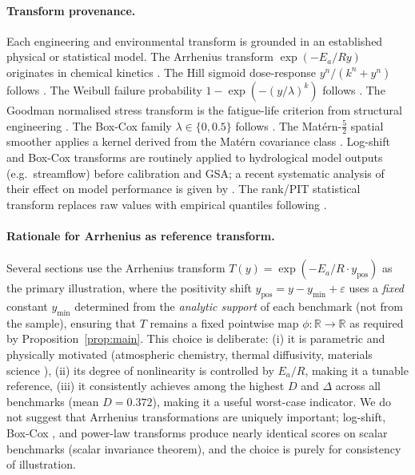 \documentclass[11pt,onecolumn]{article}
\begin{document}
\paragraph{Transform provenance.}
Each engineering and environmental transform is grounded in an established
physical or statistical model.
The Arrhenius transform $\exp(-E_a/Ry)$ originates in chemical kinetics
\citep{Arrhenius1889}.
The Hill sigmoid dose-response $y^n/(k^n + y^n)$ follows \citet{Hill1910}.
The Weibull failure probability $1 - \exp(-(y/\lambda)^k)$ follows
\citet{Weibull1951}.
The Goodman normalised stress transform is the fatigue-life criterion from
structural engineering \citep{SocieMarquis2000}.
The Box-Cox family $\lambda \in \{0, 0.5\}$ follows \citet{BoxCox1964}.
The Matérn-$\tfrac{5}{2}$ spatial smoother applies a kernel derived from the
Matérn covariance class \citep{Matern1986}.
Log-shift and Box-Cox transforms are routinely applied to hydrological model
outputs (e.g.\ streamflow) before calibration and GSA; a recent systematic
analysis of their effect on model performance is given by \citet{Thirel2024}.
The rank/PIT statistical transform replaces raw values with empirical quantiles
following \citet{Iman1979}.

\paragraph{Rationale for Arrhenius as reference transform.}
Several sections use the Arrhenius transform $T(y) = \exp(-E_a/R \cdot y_\text{pos})$
as the primary illustration, where the positivity shift
$y_\text{pos} = y - y_\text{min} + \varepsilon$ uses a \emph{fixed} constant
$y_\text{min}$ determined from the \emph{analytic support} of each benchmark
(not from the sample), ensuring that $T$ remains a fixed pointwise map
$\phi: \mathbb{R} \to \mathbb{R}$ as required by Proposition~\ref{prop:main}.
This choice is deliberate: (i) it is parametric
and physically motivated (atmospheric chemistry, thermal diffusivity, materials
science \citep{Arrhenius1889}), (ii) its degree of nonlinearity is controlled by
$E_a/R$, making it a tunable reference, (iii) it consistently achieves among the
highest $D$ and $\Delta$ across all benchmarks (mean $D = 0.372$), making it a
useful worst-case indicator. We do not suggest that Arrhenius transformations are uniquely important;
log-shift, Box-Cox \citep{BoxCox1964}, and power-law transforms produce nearly
identical scores on scalar benchmarks (scalar invariance theorem), and the
choice is purely for consistency of illustration.
\end{document}
